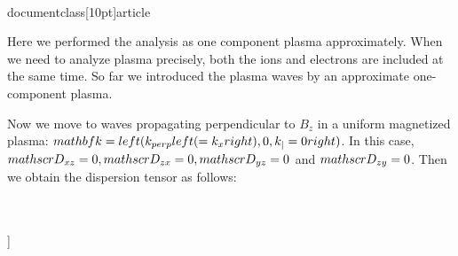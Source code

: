 \\documentclass[10pt]{article}
\begin{document}
{{{{Here we performed the analysis as one component plasma approximately. When we need to analyze plasma precisely, both the ions and electrons are included at the same time. So far we introduced the plasma waves by an approximate one-component plasma.

Now we move to waves propagating perpendicular to $B_{z}$ in a uniform magnetized plasma: $\\mathbf{k}=\\left(k_{\\perp}\\left(=k_{x}\\right), 0, k_{\\|}=0\\right)$. In this case, $\\mathscr{D}_{x z}=0, \\mathscr{D}_{z x}=0, \\mathscr{D}_{y z}=0$ and $\\mathscr{D}_{z y}=0$. Then we obtain the dispersion tensor as follows:

\\[
\\mathscr{D}=\\boldsymbol{\\epsilon}-\\left(\\frac{\\mathbf{k}^{2} c^{2}}{\\omega^{2}}\\right) \\mathbf{I}_{\\perp}=\\left[\\begin{array}{ccc}
\\epsilon_{x x}, & -i \\epsilon_{x y}, & 0  \\tag{6.150}\\\\
i \\epsilon_{y x}, & \\epsilon_{y y}-\\frac{k_{\\perp}^{2} c^{2}}{\\omega^{2}}, & 0 \\\\
0, & 0, & \\epsilon_{z z}-\\frac{k_{\\perp}^{2} c^{2}}{\\omega^{2}}
\\end{array}\\right]
\\]

}}}}
\end{document}
